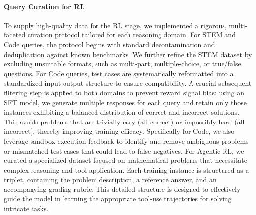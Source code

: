 \noindent\paragraph{Query Curation for RL}
To supply high-quality data for the RL stage, we implemented a rigorous, multi-faceted curation protocol tailored for each reasoning domain.
For STEM and Code queries, the protocol begins with standard decontamination and deduplication against known benchmarks. 
We further refine the STEM dataset by excluding unsuitable formats, such as multi-part, multiple-choice, or true/false questions. 
For Code queries, test cases are systematically reformatted into a standardized input-output structure to ensure compatibility. 
A crucial subsequent filtering step is applied to both domains to prevent reward signal bias: using an SFT model, we generate multiple responses for each query and retain only those instances exhibiting a balanced distribution of correct and incorrect solutions. 
This avoids problems that are trivially easy (all correct) or impossibly hard (all incorrect), thereby improving training efficacy. Specifically for Code, we also leverage sandbox execution feedback to identify and remove ambiguous problems or mismatched test cases that could lead to false negatives.
For Agentic RL, we curated a specialized dataset focused on mathematical problems that necessitate complex reasoning and tool application. 
Each training instance is structured as a triplet, containing the problem description, a reference answer, and an accompanying grading rubric. 
This detailed structure is designed to effectively guide the model in learning the appropriate tool-use trajectories for solving intricate tasks.

